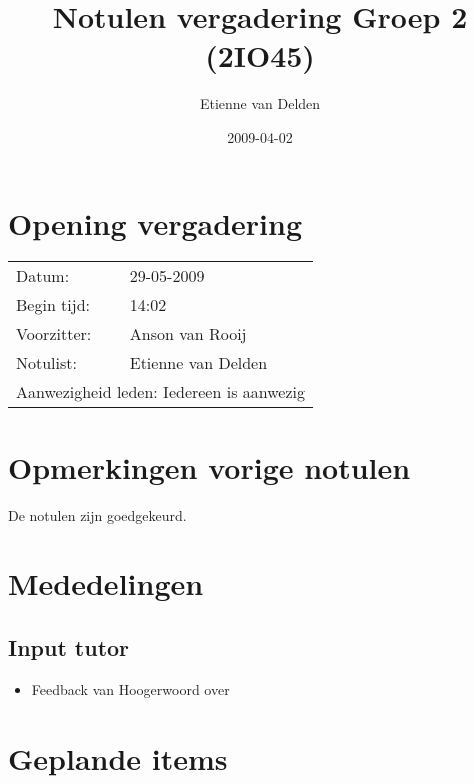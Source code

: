 \documentclass[]{article}
\title{Notulen vergadering Groep 2 (2IO45)}
\author{ Etienne van Delden }
\date{2009-04-02}
\begin{document}
\ifpdf
{}
\else
{}
\fi

\maketitle

\section{Opening vergadering} %
\label{sec:opening_vergadering}
\begin{tabular}{ll}
  Datum:      & 29-05-2009\\
  Begin tijd: & 14:02\\
  Voorzitter: & Anson van Rooij \\
  Notulist:   & Etienne van Delden\\
  \multicolumn{2}{l}{Aanwezigheid leden: Iedereen is aanwezig}\\
\end{tabular}


\section{Opmerkingen vorige notulen} %
\label{sec:opmerkingen_vorige_notulen}
  De notulen zijn goedgekeurd.

\section{Mededelingen} %
\label{sec:mededelingen}
    \subsection{Input tutor} %
    \label{sub:input_tutor}
        \begin{itemize}
            \item Feedback van Hoogerwoord over 
        \end{itemize}

\section{Geplande items} %
\label{sec:geplande_items}
\end{document}
